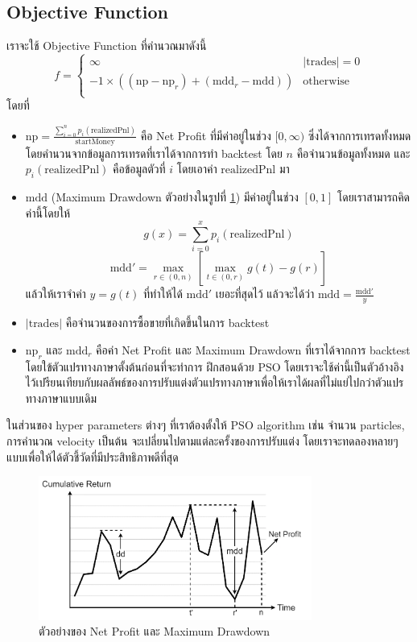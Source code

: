 \subsection{Objective Function}
เราจะใช้ Objective Function ที่คำนวณมาดังนี้ 
$$ f = 
\begin{cases}
    \infty & |\text{trades}| = 0 \\
    -1 \times ((\text{np} - \text{np}_r) + (\text{mdd}_r - \text{mdd})) & \text{otherwise} \\ 
\end{cases}
$$ 
โดยที่
\begin{itemize}
    \item {$\text{np} = \frac{\sum_{i=0}^{n} p_i(\text{realizedPnl})}{\text{startMoney}}$
          คือ Net Profit ที่มีค่าอยู่ในช่วง $[0, \infty)$ ซึ่งได้จากการเทรดทั้งหมดโดยคำนวนจากข้อมูลการเทรดที่เราได้จากการทำ backtest โดย $n$ คือจำนวนข้อมูลทั้งหมด
          และ $p_i(\text{realizedPnl})$ คือข้อมูลตัวที่ $i$ โดยเอาค่า $\text{realizedPnl}$ มา
          }
    \item {$\text{mdd}$ (Maximum Drawdown ตัวอย่างในรูปที่ \ref{fig:10}) มีค่าอยู่ในช่วง $[0, 1]$ โดยเราสามารถคิดค่านี้โดยให้
          $$
              g(x) = \sum_{i = 0}^{x}p_i(\text{realizedPnl})
          $$
          \begin{equation}
              \text{mdd}' = \max_{r \in (0, n)} \left[ \max_{t \in (0, r)} g(t) - g(r) \right]
          \end{equation}
          แล้วให้เราจำค่า $y = g(t)$ ที่ทำให้ได้
          $\text{mdd}'$ เยอะที่สุดไว้ แล้วจะได้ว่า $\text{mdd} = \frac{\text{mdd}'}{y}$
          }
    \item {$|\text{trades}|$ คือจำนวนของการซื้อขายที่เกิดขึ้นในการ backtest}
    \item {$\text{np}_r$ และ  $\text{mdd}_r$ คือค่า Net Profit และ Maximum Drawdown ที่เราได้จากการ backtest โดยใข้ตัวแปรทางภาษาตั้งต้นก่อนที่จะทำการ
          ฝึกสอนด้วย PSO โดยเราจะใช้ค่านี้เป็นตัวอ้างอิงไว้เปรียนเทียบกับผลลัพธ์ของการปรับแต่งตัวแปรทางภาษาเพื่อให้เราได้ผลที่ไม่แย่ไปกว่าตัวแปรทางภาษาแบบเดิม
          }
\end{itemize}
ในส่วนของ hyper parameters ต่างๆ ที่เราต้องตั้งให้ PSO algorithm เช่น จำนวน particles, การคำนวณ velocity เป็นต้น จะเปลี่ยนไปตามแต่ละครั้งของการปรับแต่ง
โดยเราจะทดลองหลายๆ แบบเพื่อให้ได้ตัวชี้วัดที่มีประสิทธิภาพดีที่สุด

\begin{figure}[ht]
    \centering
    \includegraphics[width=0.8\textwidth]{images/mdd.png}
    \caption{ตัวอย่างของ Net Profit และ Maximum Drawdown}
    \label{fig:10}
\end{figure}

